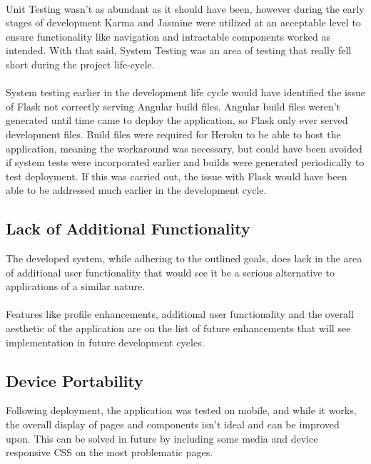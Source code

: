 \paragraph{}
Unit Testing wasn't as abundant as it should have been, however during the early stages of development Karma and Jasmine were utilized at an acceptable level to ensure functionality like navigation and intractable components worked as intended. With that said, System Testing was an area of testing that really fell short during the project life-cycle.

\paragraph{}
System testing earlier in the development life cycle would have identified the issue of Flask not correctly serving Angular build files. Angular build files weren't generated until time came to deploy the application, so Flask only ever served development files. Build files were required for Heroku to be able to host the application, meaning the workaround was necessary, but could have been avoided if system tests were incorporated earlier and builds were generated periodically to test deployment. If this was carried out, the issue with Flask would have been able to be addressed much earlier in the development cycle.

\subsection{Lack of Additional Functionality}
The developed system, while adhering to the outlined goals, does lack in the area of additional user functionality that would see it be a serious alternative to applications of a similar nature.

\newpage

\paragraph{}
Features like profile enhancements, additional user functionality and the overall aesthetic of the application are on the list of future enhancements that will see implementation in future development cycles.

\subsection{Device Portability}
Following deployment, the application was tested on mobile, and while it works, the overall display of pages and components isn't ideal and can be improved upon. This can be solved in future by including some media and device responsive CSS on the most problematic pages.

